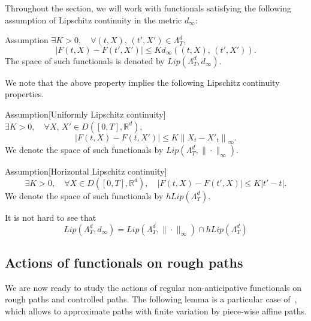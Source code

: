 \documentclass[AHL,Unicode,longabstracts,published]{cedram}
\newcommand{\Rr}{{\mathbb{R}}}
\let\oldexists\exists
\renewcommand*{\exists}{\mathrel{\oldexists}}
\let\oldforall\forall
\renewcommand*{\forall}{\mathrel{\oldforall}}
\begin{document}
Throughout the section, we will work with functionals satisfying the following assumption of Lipschitz continuity in the metric $d_{\infty}:$

\begin{enonce}{Assumption}\label{chp3ass.lipd}
$\exists K>0, \quad \forall (t, X),\, (t', X')\in \Lambda^d_T,$
\[
\left|F(t,X)-F\left(t',X'\right)\right|\leq K d_{\infty}\left((t, X),\, \left(t', X'\right)\right).
\]
The space of such functionals is denoted by $Lip(\Lambda_T^d, d_{\infty}).$
\end{enonce}

We note that the above property implies the following Lipschitz continuity properties.

\begin{enonce}{Assumption}[Uniformly Lipschitz continuity]\label{chp3ass.Fholder}
$\exists K>0, \quad \forall X,\, X'\in D([0,T], \Rr^d),$
\[
\left|F(t,X)-F\left(t,X'\right)\right|\leq K \left\|X_t-X'_t\right\|_{\infty}.
\]
We denote the space of such functionals by $Lip(\Lambda_T^d, \|\cdot\|_{\infty}).$
\end{enonce}

\begin{enonce}
{Assumption}[Horizontal Lipschitz continuity]\label{chp3ass.horizlip}
\[
\exists K>0, \quad \forall X\in D\left([0,T], \Rr^d\right),\quad \left|F(t,X)-F\left(t',X\right)\right|\leq K \left|t'-t\right|.
\]
We denote the space of such functionals by $hLip(\Lambda_T^d).$
\end{enonce}

It is not hard to see that
\[
Lip\left(\Lambda_T^d, d_{\infty}\right)=Lip\left(\Lambda_T^d, \|\cdot\|_{\infty}\right) \cap hLip\left(\Lambda_T^d\right)
\]

\subsection{Actions of functionals on rough paths}
We are now ready to study the actions of regular non-anticipative functionals on rough paths and controlled paths. The following lemma is a particular case of~\cite[Lemma~5.11]{Anna}, which allows to approximate paths with finite variation by piece-wise affine paths.
\end{document}
